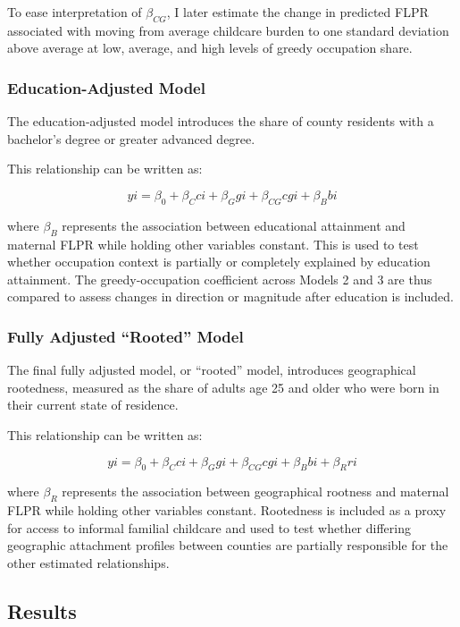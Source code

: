 \documentclass[
  letterpaper,
  DIV=11,
  numbers=noendperiod]{scrartcl}
\begin{document}
To ease interpretation of \(\beta_{CG}\), I later estimate the change in
predicted FLPR associated with moving from average childcare burden to
one standard deviation above average at low, average, and high levels of
greedy occupation share.

\subsubsection{Education-Adjusted Model}\label{education-adjusted-model}

The education-adjusted model introduces the share of county residents
with a bachelor's degree or greater advanced degree.

This relationship can be written as:

\[
yi = \beta_0 + \beta_{C}ci + \beta_{G}gi + \beta_{CG}cgi + \beta_{B}bi
\]

where \(\beta_{B}\) represents the association between educational
attainment and maternal FLPR while holding other variables constant.
This is used to test whether occupation context is partially or
completely explained by education attainment. The greedy-occupation
coefficient across Models 2 and 3 are thus compared to assess changes in
direction or magnitude after education is included.

\subsubsection{Fully Adjusted ``Rooted''
Model}\label{fully-adjusted-rooted-model}

The final fully adjusted model, or ``rooted'' model, introduces
geographical rootedness, measured as the share of adults age 25 and
older who were born in their current state of residence.

This relationship can be written as:

\[
yi = \beta_0 + \beta_{C}ci + \beta_{G}gi + \beta_{CG}cgi + \beta_{B}bi + \beta_{R}ri
\]

where \(\beta_{R}\) represents the association between geographical
rootness and maternal FLPR while holding other variables constant.
Rootedness is included as a proxy for access to informal familial
childcare and used to test whether differing geographic attachment
profiles between counties are partially responsible for the other
estimated relationships.

\subsection{Results}\label{sec-4}
\end{document}
